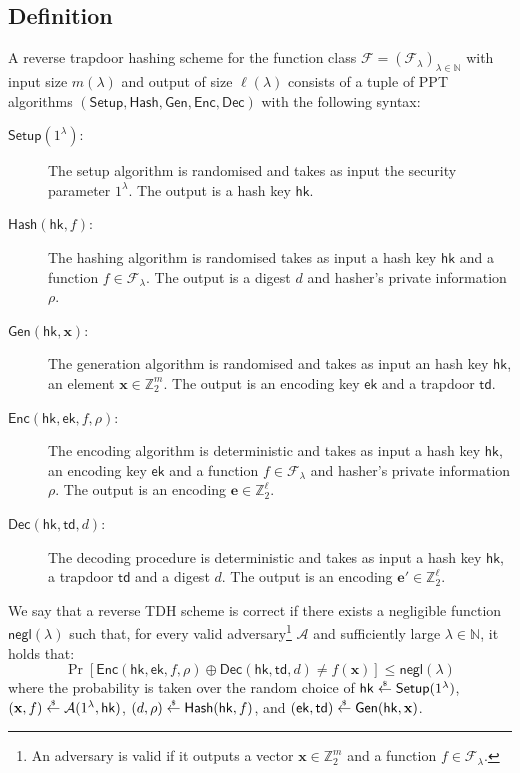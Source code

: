 \documentclass{theoretics}
\newcommand{\ek}{\mathsf{ek}}
\newcommand{\td}{\mathsf{td}}
\newcommand{\getsr}{\overset{\raisebox{-1pt}{$\scriptscriptstyle \$$}}{\gets}}
\newcommand{\sample}{\getsr}
\newcommand{\N}{\mathbb{N}}
\newcommand{\Z}{\mathbb{Z}}
\newcommand{\negl}{\mathsf{negl}}
\renewcommand{\sec}{\ensuremath{\lambda}}
\newcommand{\Adv}{\mathcal{A}}
\newcommand{\algofont}[1]{\ensuremath{\mathsf{#1}}}
\newcommand{\Enc}{{\algofont{Enc}}}
\newcommand{\Dec}{{\algofont{Dec}}}
\newcommand{\Setup}{{\algofont{Setup}}}
\newcommand{\Gen}{{\algofont{Gen}}}
\newcommand{\Hash}{{\algofont{Hash}}}
\newcommand{\hk}{\ensuremath{\mathsf{hk}}}
\newcommand\bbbone{1}
\begin{document}
\subsection{Definition}

\begin{definition}
A reverse trapdoor hashing scheme for the function class $\mathcal{F}=(\mathcal{F}_\sec)_{\sec\in\N}$ with input size $m(\sec)$ and output of size $\ell(\sec)$ consists of a tuple of PPT algorithms $(\Setup, \Hash, \Gen, \Enc, \Dec)$ with the following syntax:
\begin{description}
\item[$\Setup(\bbbone^\sec)$:] The setup algorithm is randomised and takes as input the security parameter $\bbbone^\sec$. The output is a hash key $\hk$.
\item[$\Hash(\hk, f)$:] The hashing algorithm is randomised takes as input a hash key $\hk$ and a function $f\in\mathcal{F}_\sec$. The output is a digest $d$ and hasher's private information $\rho$.
\item[$\Gen(\hk, \mathbf{x})$:] The generation algorithm is randomised and takes as input an hash key $\hk$, an element $\mathbf{x}\in\Z_2^m$. The output is an encoding key $\ek$ and a trapdoor $\td$. 
\item[$\Enc(\hk, \ek, f, \rho)$:] The encoding algorithm is deterministic and takes as input a hash key $\hk$, an encoding key $\ek$ and a function $f\in\mathcal{F}_\sec$ and hasher's private information $\rho$. The output is an encoding $\mathbf{e}\in\Z_2^\ell$.
\item[$\Dec(\hk, \td, d)$:] The decoding procedure is deterministic and takes as input a hash key $\hk$, a trapdoor $\td$ and a digest $d$. The output is an encoding $\mathbf{e}'\in\Z_2^\ell$.
\end{description}
\end{definition}

{
\begin{definition}[Correctness]
We say that a reverse TDH scheme is correct if there exists a negligible function $\negl(\sec)$ such that, for every valid adversary\footnote{An adversary is valid if it outputs a vector $\mathbf{x}\in\Z_2^m$ and a function $f\in\mathcal{F}_\sec$.} $\Adv$ and sufficiently large $\sec\in\N$, it holds that:
\[\Pr\left[\Enc(\hk, \ek, f, \rho)\oplus \Dec(\hk, \td, d)\ne f(\mathbf{x})\right]\le \negl(\sec)\]
where the probability is taken over the random choice of $\hk\sample\Setup(\bbbone^\sec)$, $(\mathbf{x}, f)\sample\Adv(1^\sec, \hk)$, $(d,\rho)\sample\Hash(\hk, f)$, and $(\ek, \td)\sample\Gen(\hk, \mathbf{x})$.
\end{definition}}
\end{document}
